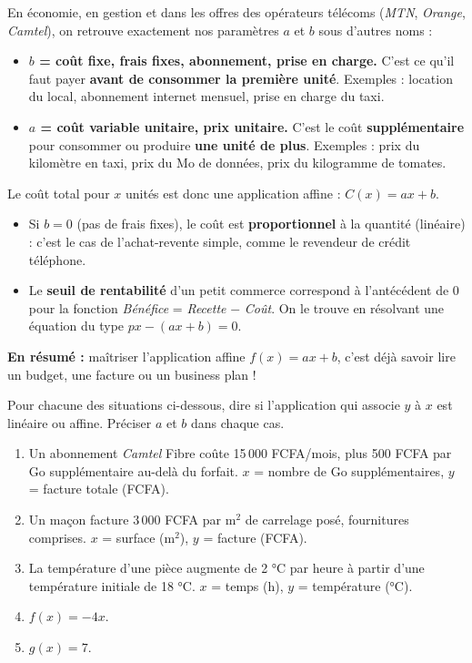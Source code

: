\documentclass[11pt]{article}
\begin{document}
\begin{savaistu}
En économie, en gestion et dans les offres des opérateurs télécoms (\emph{MTN}, \emph{Orange}, \emph{Camtel}), on retrouve exactement nos paramètres $a$ et $b$ sous d'autres noms :
\begin{itemize}
    \item \textbf{$b$ = coût fixe, frais fixes, abonnement, prise en charge.} C'est ce qu'il faut payer \textbf{avant de consommer la première unité}. Exemples : location du local, abonnement internet mensuel, prise en charge du taxi.
    \item \textbf{$a$ = coût variable unitaire, prix unitaire.} C'est le coût \textbf{supplémentaire} pour consommer ou produire \textbf{une unité de plus}. Exemples : prix du kilomètre en taxi, prix du Mo de données, prix du kilogramme de tomates.
\end{itemize}
Le coût total pour $x$ unités est donc une application affine : $C(x) = ax + b$.
\begin{itemize}
    \item Si $b=0$ (pas de frais fixes), le coût est \textbf{proportionnel} à la quantité (linéaire) : c'est le cas de l'achat-revente simple, comme le revendeur de crédit téléphone.
    \item Le \textbf{seuil de rentabilité} d'un petit commerce correspond à l'antécédent de 0 pour la fonction \emph{Bénéfice} = \emph{Recette} $-$ \emph{Coût}. On le trouve en résolvant une équation du type $px - (ax+b) = 0$.
\end{itemize}
\textbf{En résumé :} maîtriser l'application affine $f(x)=ax+b$, c'est déjà savoir lire un budget, une facture ou un business plan !
\end{savaistu}

\begin{exercice}
Pour chacune des situations ci-dessous, dire si l'application qui associe $y$ à $x$ est linéaire ou affine. Préciser $a$ et $b$ dans chaque cas.
\begin{enumerate}
    \item Un abonnement \emph{Camtel} Fibre coûte 15\,000 FCFA/mois, plus 500 FCFA par Go supplémentaire au-delà du forfait. $x$ = nombre de Go supplémentaires, $y$ = facture totale (FCFA).
    \item Un maçon facture 3\,000 FCFA par m$^2$ de carrelage posé, fournitures comprises. $x$ = surface (m$^2$), $y$ = facture (FCFA).
    \item La température d'une pièce augmente de 2 °C par heure à partir d'une température initiale de 18 °C. $x$ = temps (h), $y$ = température (°C).
    \item $f(x) = -4x$.
    \item $g(x) = 7$.
\end{enumerate}
\end{exercice}
\end{document}
